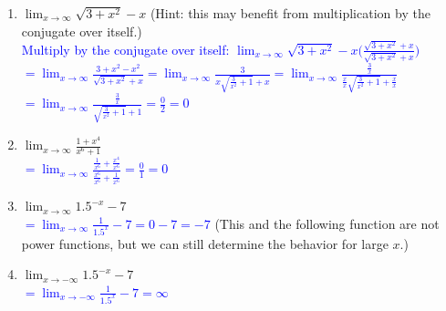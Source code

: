\documentclass{ximera}
\begin{document}
\begin{exercise}
\begin{enumerate}
    \item $\displaystyle \lim_{x\rightarrow \infty} \sqrt{3+x^2}-x$ (Hint: this may benefit from multiplication by the conjugate over itself.)\\
    \textcolor{blue}{Multiply by the conjugate over itself: $\displaystyle \lim_{x\rightarrow \infty}\sqrt{3+x^2}-x\bigg(\frac{\sqrt{3+x^2}+x}{\sqrt{3+x^2}+x}\bigg)$\\
    $=\displaystyle \lim_{x\rightarrow \infty} \frac{3+x^2-x^2}{\sqrt{3+x^2}+x}=\lim_{x\rightarrow \infty}\frac{3}{x\sqrt{\frac{3}{x^2}+1}+x}=\lim_{x\rightarrow \infty}\frac{\frac3x}{\frac{x}{x}\sqrt{\frac{3}{x^2}+1}+\frac{x}{x}}$\\
    $\displaystyle=\lim_{x\rightarrow \infty}\frac{\frac3x}
    {\sqrt{\frac{3}{x^2}+1}+1}=\frac{0}{2}=0$}

    \item $\displaystyle\lim_{x\rightarrow \infty}\frac{1+x^4}{x^6+1}$\\
    \textcolor{blue}{$\displaystyle =\lim_{x\rightarrow \infty}\frac{\frac{1}{x^6}+\frac{x^4}{x^6}}{\frac{x^6}{x^6}+\frac{1}{x^6}}=\frac{0}{1}=0$}
    

    \item $\displaystyle \lim_{x\rightarrow \infty} 1.5^{-x}-7$\\
    \textcolor{blue}{$\displaystyle =\lim_{x\rightarrow \infty} \frac{1}{1.5^x}-7=0-7=-7$} (This and the following function are not power functions, but we can still determine the behavior for large $x$.)

    \item $\displaystyle \lim_{x\rightarrow -\infty} 1.5^{-x}-7$\\
    \textcolor{blue}{$\displaystyle =\lim_{x\rightarrow -\infty} \frac{1}{1.5^x}-7=\infty$}
    
    
  \end{enumerate}
\end{exercise} 
    
\end{document}
